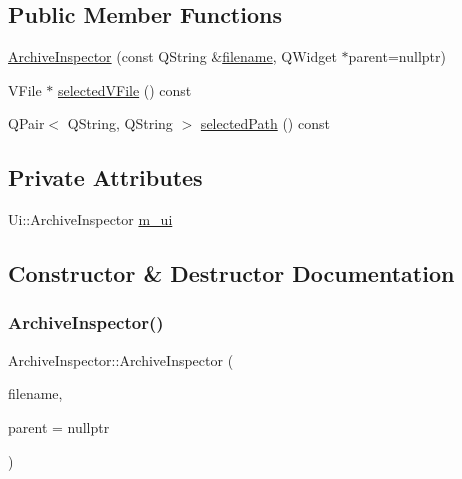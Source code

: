 \subsection*{Public Member Functions}
\begin{DoxyCompactItemize}
\item 
\mbox{\hyperlink{class_q_g_b_a_1_1_archive_inspector_a5b97432c55735424ff85b8f583a446e9}{Archive\+Inspector}} (const Q\+String \&\mbox{\hyperlink{ioapi_8h_a2c8e3f833d9ea6f106973ebe4391bf0f}{filename}}, Q\+Widget $\ast$parent=nullptr)
\item 
V\+File $\ast$ \mbox{\hyperlink{class_q_g_b_a_1_1_archive_inspector_ad7a83f69c1eaa81245e83eddd9defd79}{selected\+V\+File}} () const
\item 
Q\+Pair$<$ Q\+String, Q\+String $>$ \mbox{\hyperlink{class_q_g_b_a_1_1_archive_inspector_af54eb24ee69ea0505d9c57db5d46e003}{selected\+Path}} () const
\end{DoxyCompactItemize}
\subsection*{Private Attributes}
\begin{DoxyCompactItemize}
\item 
Ui\+::\+Archive\+Inspector \mbox{\hyperlink{class_q_g_b_a_1_1_archive_inspector_a651fb5f007dbfc161b7fe107b7f8eb16}{m\+\_\+ui}}
\end{DoxyCompactItemize}


\subsection{Constructor \& Destructor Documentation}
\mbox{\label{class_q_g_b_a_1_1_archive_inspector_a5b97432c55735424ff85b8f583a446e9}} 
\subsubsection{\texorpdfstring{Archive\+Inspector()}{ArchiveInspector()}}
{\footnotesize\ttfamily Archive\+Inspector\+::\+Archive\+Inspector (\begin{DoxyParamCaption}\item[{const Q\+String \&}]{filename,  }\item[{Q\+Widget $\ast$}]{parent = {\ttfamily nullptr} }\end{DoxyParamCaption})}



